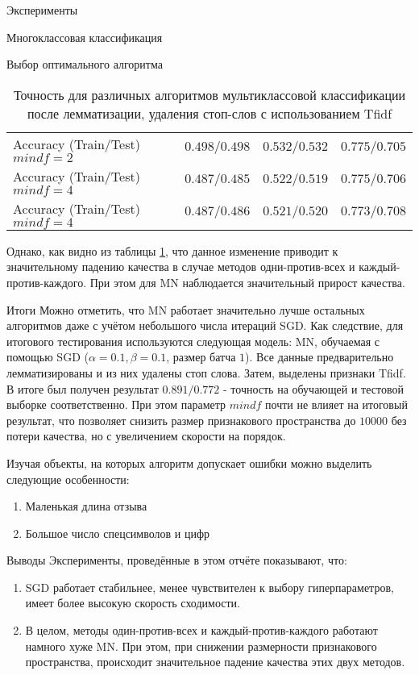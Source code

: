 \documentclass[a4paper,12pt,titlepage,finall]{article}
\begin{document}
\begin{section}{Эксперименты}
\begin{subsection}{Многоклассовая классификация}
\begin{subsubsection}{Выбор оптимального алгоритма}
\begin{table}[H]
\begin{tabular}{l|lll}
		\hline
		Accuracy (Train/Test) $mindf=2$ & $0.498/0.498$ & $0.532/0.532$ & $0.775/0.705$ \\
		Accuracy (Train/Test) $mindf=4$ & $0.487/0.485$ & $0.522/0.519$ & $0.775/0.706$ \\
		Accuracy (Train/Test) $mindf=4$ & $0.487/0.486$ & $0.521/0.520$ & $0.773/0.708$ \\
	\end{tabular}	
	\centering
	\caption{Точность для различных алгоритмов мультиклассовой классификации после лемматизации, удаления стоп-слов с использованием Tfidf}
	\label{tbl:3}
\end{table}
Однако, как видно из таблицы \ref{tbl:3}, что данное изменение приводит к значительному падению качества в случае методов одни-против-всех и каждый-против-каждого. При этом для MN наблюдается значительный прирост качества.
\par
\end{subsubsection}

\begin{subsubsection}{Итоги}
	Можно отметить, что MN работает значительно лучше остальных алгоритмов даже с учётом небольшого числа итераций SGD. Как следствие, для итогового тестирования используются следующая модель: MN, обучаемая с помощью SGD ($\alpha=0.1, \beta=0.1$, размер батча $1$). Все данные предварительно лемматизированы и из них удалены стоп слова. Затем, выделены признаки Tfidf. В итоге был получен результат $0.891/0.772$ - точность на обучающей и тестовой выборке соответственно. При этом параметр $mindf$ почти не влияет на итоговый результат, что позволяет снизить размер признакового пространства до $10000$ без потери качества, но с увеличением скорости на порядок.	
	\par
	Изучая объекты, на которых алгоритм допускает ошибки можно выделить следующие особенности:
	\begin{enumerate}
		\item Маленькая длина отзыва
		\item Большое число спецсимволов и цифр
	\end{enumerate}
	
\end{subsubsection}

\end{subsection}

\end{section}

\begin{section}{Выводы}
	Эксперименты, проведённые в этом отчёте показывают, что:
	\begin{enumerate}
		\item SGD работает стабильнее, менее чувствителен к выбору гиперпараметров, имеет более высокую скорость сходимости.
		\item В целом, методы один-против-всех и каждый-против-каждого работают намного хуже MN. При этом, при снижении размерности признакового пространства, происходит значительное падение качества этих двух методов.
	\end{enumerate}
\end{section}
\end{document}
